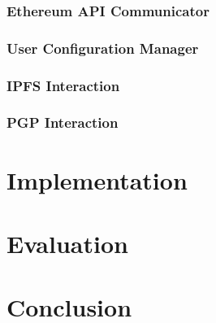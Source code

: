 \documentclass[12pt,a4paper]{report}
\begin{document}
	\subsection{Ethereum API Communicator}
	
	\subsection{User Configuration Manager}
	
	\subsection{IPFS Interaction}
	
	\subsection{PGP Interaction}
	
	\chapter{Implementation}
	
	\chapter{Evaluation}
	
	\chapter{Conclusion}
	
	
	
\end{document}
